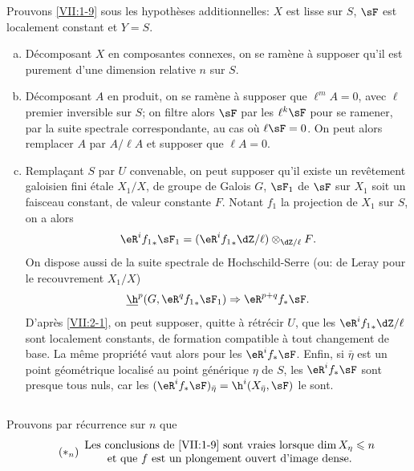 Prouvons \ref{VII:1-9} sous les hypothèses additionnelles: $X$ est lisse sur 
$S$, $\sF$ est localement constant et $Y=S$. 
\begin{enumerate}[a)]
  \item Décomposant $X$ en composantes connexes, on se ramène à supposer 
    qu'il est purement d'une dimension relative $n$ sur $S$. 
  \item Décomposant $A$ en produit, on se ramène à supposer que 
    $\ell^m A=0$, avec $\ell$ premier inversible sur $S$; on filtre alors $\sF$ 
    par les $\ell^k \sF$ pour se ramener, par la suite spectrale 
    correspondante, au cas où $\ell\sF=0$. On peut alors remplacer $A$ par 
    $A/\ell A$ et supposer que $\ell A=0$. 
  \item Remplaçant $S$ par $U$ convenable, on peut supposer qu'il existe un 
    revêtement galoisien fini étale $X_1/X$, de groupe de Galois $G$,  $\sF_1$ de $\sF$ sur $X_1$ soit un faisceau 
    constant, de valeur constante $F$. Notant $f_1$ la projection de $X_1$ sur 
    $S$, on a alors 
    \[
      \eR^i {f_1}_\ast \sF_1 = (\eR^i {f_1}_\ast \dZ/\ell)\otimes_{\dZ/\ell} F \text{.} 
    \]
    On dispose aussi de la suite spectrale de Hochschild-Serre (ou: de Leray 
    pour le recouvrement $X_1/X$) 
    \[
      \underline\h^p(G,\eR^q {f_1}_\ast \sF_1) \Rightarrow \eR^{p+q} f_\ast \sF \text{.} 
    \]
    D'après \ref{VII:2-1}, on peut supposer, quitte à rétrécir $U$, que 
    les $\eR^i {f_1}_\ast \dZ/\ell$ sont localement constants, de formation 
    compatible à tout changement de base. La même propriété vaut alors 
    pour les $\eR^i f_\ast \sF$. Enfin, si $\bar\eta$ est un point 
    géométrique localisé au point générique $\eta$ de $S$, les 
    $\eR^i f_\ast\sF$ sont presque tous nuls, car les 
    $(\eR^i f_\ast \sF)_{\bar\eta} = \h^i(X_{\bar \eta},\sF)$ le sont. 
\end{enumerate}





\subsection{}\label{VII:2-3}

Prouvons par récurrence sur $n$ que 
\begin{equation*}\tag{$\ast_n$}\label{VII:eq:2-3-1}
  \begin{array}{c}
    \text{Les conclusions de \ref{VII:1-9} sont vraies lorsque $\dim{X_\eta}\leqslant n$} \\
    \text{et que $f$ est un plongement ouvert d'image dense.}
  \end{array}
\end{equation*}

